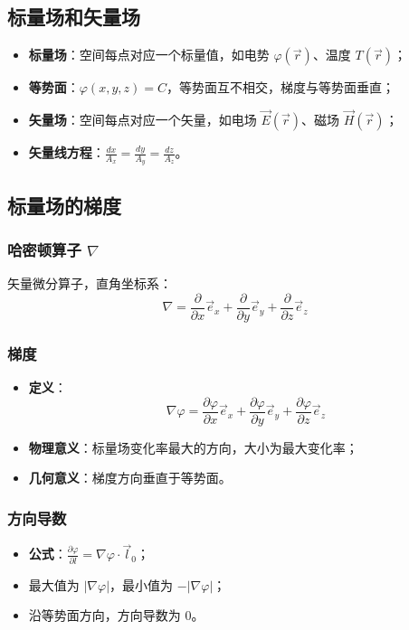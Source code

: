 \subsection{标量场和矢量场}
\begin{itemize}
    \item \textbf{标量场}：空间每点对应一个标量值，如电势 $\varphi(\vec{r})$、温度 $T(\vec{r})$；
    \item \textbf{等势面}：$\varphi(x,y,z) = C$，等势面互不相交，梯度与等势面垂直；
    \item \textbf{矢量场}：空间每点对应一个矢量，如电场 $\vec{E}(\vec{r})$、磁场 $\vec{H}(\vec{r})$；
    \item \textbf{矢量线方程}：$\displaystyle \frac{dx}{A_x} = \frac{dy}{A_y} = \frac{dz}{A_z}$。
\end{itemize}

\subsection{标量场的梯度}
\subsubsection{哈密顿算子 $\nabla$}
矢量微分算子，直角坐标系：
\[
\nabla = \frac{\partial}{\partial x}\vec{e}_x + \frac{\partial}{\partial y}\vec{e}_y + \frac{\partial}{\partial z}\vec{e}_z
\]

\subsubsection{梯度}
\begin{itemize}
    \item \textbf{定义}：
    \[
    \nabla \varphi = \frac{\partial \varphi}{\partial x}\vec{e}_x + \frac{\partial \varphi}{\partial y}\vec{e}_y + \frac{\partial \varphi}{\partial z}\vec{e}_z
    \]
    \item \textbf{物理意义}：标量场变化率最大的方向，大小为最大变化率；
    \item \textbf{几何意义}：梯度方向垂直于等势面。
\end{itemize}

\subsubsection{方向导数}
\begin{itemize}
    \item \textbf{公式}：$\displaystyle \frac{\partial \varphi}{\partial l} = \nabla \varphi \cdot \vec{l}_0$；
    \item 最大值为 $|\nabla\varphi|$，最小值为 $-|\nabla\varphi|$；
    \item 沿等势面方向，方向导数为 $0$。
\end{itemize}


